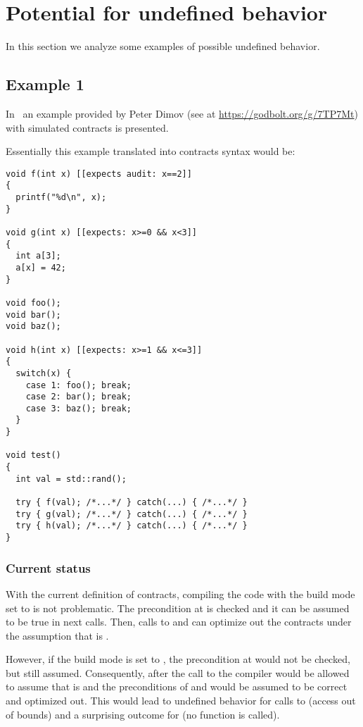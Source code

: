 \section{Potential for undefined behavior}

In this section we analyze some examples of possible undefined behavior.

\subsection{Example 1}

In~\cite{p1321r0} an example provided by Peter Dimov (see at
\url{https://godbolt.org/g/7TP7Mt}) with simulated contracts 
is presented.

Essentially this example translated into contracts syntax would be:

\begin{lstlisting}
void f(int x) [[expects audit: x==2]]
{
  printf("%d\n", x);
}

void g(int x) [[expects: x>=0 && x<3]]
{
  int a[3];
  a[x] = 42;
}

void foo();
void bar();
void baz();

void h(int x) [[expects: x>=1 && x<=3]]
{
  switch(x) {
    case 1: foo(); break;
    case 2: bar(); break;
    case 3: baz(); break;
  }
}

void test()
{
  int val = std::rand();

  try { f(val); /*...*/ } catch(...) { /*...*/ }
  try { g(val); /*...*/ } catch(...) { /*...*/ }
  try { h(val); /*...*/ } catch(...) { /*...*/ }
}
\end{lstlisting}

\subsubsection{Current status}

With the current definition of contracts, compiling the code with the build mode
set to  is not problematic. The precondition at  is
checked and it can be assumed to be true in next calls. Then, calls to 
and  can optimize out the contracts under the assumption that
 is . 

However, if the build mode is set to , the precondition at
 would not be checked, but still assumed.  Consequently, after the
call to  the compiler would be allowed to assume that 
is  and the preconditions of  and  would be
assumed to be correct and optimized out.  This would lead to undefined behavior
for calls to  (access out of bounds) and a surprising outcome for
 (no function is called).

